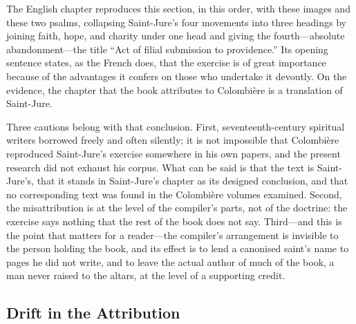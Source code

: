 The English chapter reproduces this section, in this order, with these images and these two psalms, collapsing Saint-Jure's four movements into three headings by joining faith, hope, and charity under one head and giving the fourth---absolute abandonment---the title ``Act of filial submission to providence.'' Its opening sentence states, as the French does, that the exercise is of great importance because of the advantages it confers on those who undertake it devoutly. On the evidence, the chapter that the book attributes to Colombière is a translation of Saint-Jure.

Three cautions belong with that conclusion. First, seventeenth-century spiritual writers borrowed freely and often silently; it is not impossible that Colombière reproduced Saint-Jure's exercise somewhere in his own papers, and the present research did not exhaust his corpus. What can be said is that the text is Saint-Jure's, that it stands in Saint-Jure's chapter as its designed conclusion, and that no corresponding text was found in the Colombière volumes examined. Second, the misattribution is at the level of the compiler's parts, not of the doctrine: the exercise says nothing that the rest of the book does not say. Third---and this is the point that matters for a reader---the compiler's arrangement is invisible to the person holding the book, and its effect is to lend a canonised saint's name to pages he did not write, and to leave the actual author of much of the book, a man never raised to the altars, at the level of a supporting credit.

\subsection{Drift in the Attribution}

